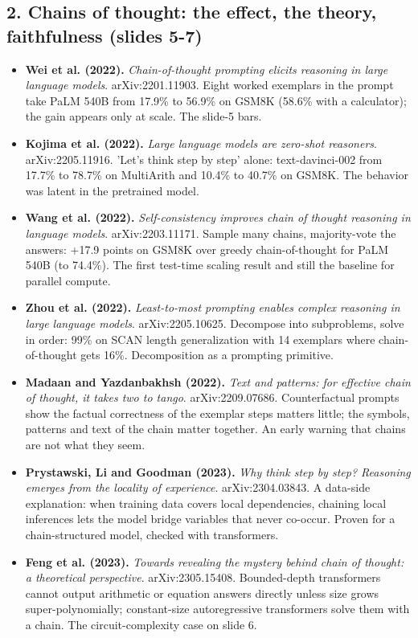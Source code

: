 \documentclass[11pt,letterpaper]{article}
\begin{document}
\subsection*{2. Chains of thought: the effect, the theory, faithfulness (slides 5-7)}
\begin{itemize}[leftmargin=1.2em,itemsep=3pt]\sloppy
\item \textbf{Wei et al. (2022).} \textit{Chain-of-thought prompting elicits reasoning in large language models}. arXiv:2201.11903. Eight worked exemplars in the prompt take PaLM 540B from 17.9\% to 56.9\% on GSM8K (58.6\% with a calculator); the gain appears only at scale. The slide-5 bars.
\item \textbf{Kojima et al. (2022).} \textit{Large language models are zero-shot reasoners}. arXiv:2205.11916. 'Let's think step by step' alone: text-davinci-002 from 17.7\% to 78.7\% on MultiArith and 10.4\% to 40.7\% on GSM8K. The behavior was latent in the pretrained model.
\item \textbf{Wang et al. (2022).} \textit{Self-consistency improves chain of thought reasoning in language models}. arXiv:2203.11171. Sample many chains, majority-vote the answers: +17.9 points on GSM8K over greedy chain-of-thought for PaLM 540B (to 74.4\%). The first test-time scaling result and still the baseline for parallel compute.
\item \textbf{Zhou et al. (2022).} \textit{Least-to-most prompting enables complex reasoning in large language models}. arXiv:2205.10625. Decompose into subproblems, solve in order: 99\% on SCAN length generalization with 14 exemplars where chain-of-thought gets 16\%. Decomposition as a prompting primitive.
\item \textbf{Madaan and Yazdanbakhsh (2022).} \textit{Text and patterns: for effective chain of thought, it takes two to tango}. arXiv:2209.07686. Counterfactual prompts show the factual correctness of the exemplar steps matters little; the symbols, patterns and text of the chain matter together. An early warning that chains are not what they seem.
\item \textbf{Prystawski, Li and Goodman (2023).} \textit{Why think step by step? Reasoning emerges from the locality of experience}. arXiv:2304.03843. A data-side explanation: when training data covers local dependencies, chaining local inferences lets the model bridge variables that never co-occur. Proven for a chain-structured model, checked with transformers.
\item \textbf{Feng et al. (2023).} \textit{Towards revealing the mystery behind chain of thought: a theoretical perspective}. arXiv:2305.15408. Bounded-depth transformers cannot output arithmetic or equation answers directly unless size grows super-polynomially; constant-size autoregressive transformers solve them with a chain. The circuit-complexity case on slide 6.

\end{itemize}
\end{document}
